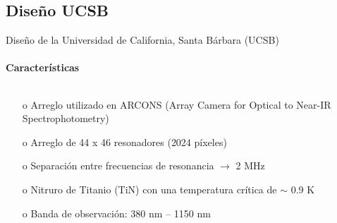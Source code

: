 \documentclass[ignorenonframetext,12pt]{beamer}
\begin{document}
\subsection{Diseño UCSB}
\begin{frame}{Diseño de la Universidad de California, Santa Bárbara (UCSB)}
				\framesubtitle{Características}
				\begin{columns}
								\begin{column}{0.49\textwidth}
												\begin{itemize}
																\item[o] Arreglo utilizado en
																				{\color{blue}ARCONS} (Array
																				Camera for Optical to Near-IR
																				Spectrophotometry)
																\item[o] Arreglo de 44 x 46 resonadores (\alert{2024
																				píxeles})
																\item[o] Separación entre frecuencias de
																				resonancia $\to$ \alert{2 MHz}
																\item[o] Nitruro de Titanio (TiN) con una temperatura
																				crítica de \alert{$\sim$ 0.9 K}
																\item[o] Banda de observación: \alert{380 nm --
																				1150 nm}
												\end{itemize}
								\end{column}
								\begin{column}{0.49\textwidth}
												\centering
								\end{column}
				\end{columns}
\end{frame}
\end{document}
